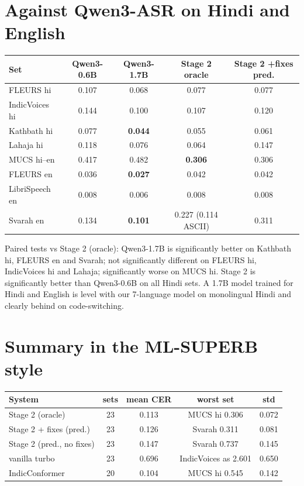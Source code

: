 \section{Against Qwen3-ASR on Hindi and English}

\begin{center}
\begin{tabular}{lcccc}
\toprule
Set & Qwen3-0.6B & Qwen3-1.7B & Stage 2 oracle & Stage 2 +fixes pred.\\
\midrule
FLEURS hi & 0.107 & 0.068 & 0.077 & 0.077\\
IndicVoices hi & 0.144 & 0.100 & 0.107 & 0.120\\
Kathbath hi & 0.077 & \textbf{0.044} & 0.055 & 0.061\\
Lahaja hi & 0.118 & 0.076 & 0.064 & 0.147\\
MUCS hi--en & 0.417 & 0.482 & \textbf{0.306} & 0.306\\
FLEURS en & 0.036 & \textbf{0.027} & 0.042 & 0.042\\
LibriSpeech en & 0.008 & 0.006 & 0.008 & 0.008\\
Svarah en & 0.134 & \textbf{0.101} & 0.227 (0.114 ASCII) & 0.311\\
\bottomrule
\end{tabular}
\end{center}
Paired tests vs Stage 2 (oracle): Qwen3-1.7B is significantly better on Kathbath hi, FLEURS en and Svarah; not significantly
different on FLEURS hi, IndicVoices hi and Lahaja; significantly worse on MUCS hi. Stage 2 is significantly better than Qwen3-0.6B
on all Hindi sets. A 1.7B model trained for Hindi and English is level with our 7-language model on monolingual Hindi and clearly
behind on code-switching.

\section{Summary in the ML-SUPERB style}

\begin{center}
\begin{tabular}{lcccc}
\toprule
System & sets & mean CER & worst set & std\\
\midrule
Stage 2 (oracle) & 23 & 0.113 & MUCS hi 0.306 & 0.072\\
Stage 2 + fixes (pred.) & 23 & 0.126 & Svarah 0.311 & 0.081\\
Stage 2 (pred., no fixes) & 23 & 0.147 & Svarah 0.737 & 0.145\\
vanilla turbo & 23 & 0.696 & IndicVoices as 2.601 & 0.650\\
IndicConformer & 20 & 0.104 & MUCS hi 0.545 & 0.142\\
\bottomrule
\end{tabular}
\end{center}

